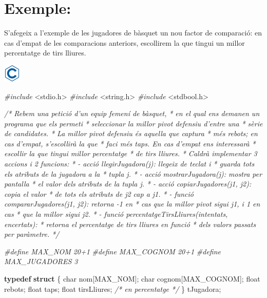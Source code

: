 \documentclass[]{book}
\newenvironment{Shaded}{\begin{snugshade}}{\end{snugshade}}
\newcommand{\KeywordTok}[1]{\textcolor[rgb]{0.13,0.29,0.53}{\textbf{#1}}}
\newcommand{\DataTypeTok}[1]{\textcolor[rgb]{0.13,0.29,0.53}{#1}}
\newcommand{\ImportTok}[1]{#1}
\newcommand{\CommentTok}[1]{\textcolor[rgb]{0.56,0.35,0.01}{\textit{#1}}}
\newcommand{\PreprocessorTok}[1]{\textcolor[rgb]{0.56,0.35,0.01}{\textit{#1}}}
\newcommand{\NormalTok}[1]{#1}
\begin{document}
\section{Exemple:}\label{exemple}

S'afegeix a l'exemple de les jugadores de bàsquet un nou factor de
comparació: en cas d'empat de les comparacions anteriors, escollirem la
que tingui un millor percentatge de tirs lliures.

\includegraphics{./img/c.png}

\begin{Shaded}
\begin{Highlighting}[]
\PreprocessorTok{#include }\ImportTok{<stdio.h>}
\PreprocessorTok{#include }\ImportTok{<string.h>}
\PreprocessorTok{#include }\ImportTok{<stdbool.h>}

\CommentTok{/* Rebem una petició d'un equip femení de bàsquet,}
\CommentTok{ * en el qual ens demanen un programa que els permeti}
\CommentTok{ * seleccionar la millor pivot defensiu d'entre una }
\CommentTok{ * sèrie de candidates.}
\CommentTok{ * La millor pivot defensiu és aquella que captura}
\CommentTok{ * més rebots; en cas d'empat, s'escollirà la que}
\CommentTok{ * faci més taps. En cas d'empat ens interessarà}
\CommentTok{ * escollir la que tingui millor percentatge}
\CommentTok{ * de tirs lliures.}
\CommentTok{ * Caldrà implementar 3 accions i 2 funcions:}
\CommentTok{ * - acció llegirJugadora(j): llegeix de teclat i}
\CommentTok{ *   guarda tots els atributs de la jugadora a la}
\CommentTok{ *   tupla j.}
\CommentTok{ * - acció mostrarJugadora(j): mostra per pantalla}
\CommentTok{ *   el valor dels atributs de la tupla j.}
\CommentTok{ * - acció copiarJugadores(j1, j2): copia el valor}
\CommentTok{ *   de tots els atributs de j2 cap a j1.}
\CommentTok{ * - funció compararJugadores(j1, j2): retorna -1 en }
\CommentTok{ *   cas que la millor pivot sigui j1, i 1 en cas }
\CommentTok{ *   que la millor sigui j2.}
\CommentTok{ * - funció percentatgeTirsLliures(intentats, encertats):}
\CommentTok{ *   retorna el percentatge de tirs lliures en funció}
\CommentTok{ *   dels valors passats per paràmetre.}
\CommentTok{ */}
 
\PreprocessorTok{#define MAX_NOM 20+1}
\PreprocessorTok{#define MAX_COGNOM 20+1}
\PreprocessorTok{#define MAX_JUGADORES 3}

\KeywordTok{typedef} \KeywordTok{struct}\NormalTok{ \{}
    \DataTypeTok{char}\NormalTok{ nom[MAX_NOM];}
    \DataTypeTok{char}\NormalTok{ cognom[MAX_COGNOM];}
    \DataTypeTok{float}\NormalTok{ rebots;}
    \DataTypeTok{float}\NormalTok{ taps;}
    \DataTypeTok{float}\NormalTok{ tirsLliures; }\CommentTok{/* en percentatge */}
\NormalTok{\} tJugadora;}


\end{Highlighting}
\end{Shaded}
\end{document}
